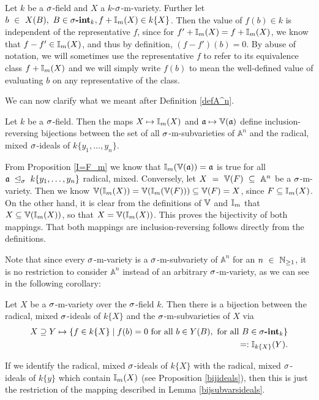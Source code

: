 \begin{rem}
Let $k$ be a $\sigma$-field and $X$ a $k$-$\sigma$-m-variety. Further let $b~\in~X(B), ~ B \in \sigma\text{{\normalfont\textbf{-int}}}_k, f + \mathbb{I}_m(X) \in k\{X\}$. Then the value of $f(b) \in k$ is independent of the representative $f$,
since for $f' + \mathbb{I}_m(X) = f + \mathbb{I}_m(X)$, we know that $f - f' \in \mathbb{I}_m(X)$, and thus by definition, $(f - f')(b) = 0$. By abuse of notation,
we will sometimes use the representative $f$ to refer to its equivalence class $f + \mathbb{I}_m(X)$ and we will simply write $f(b)$ to mean the well-defined value of evaluating $b$ on any representative of the class.
\end{rem}

We can now clarify what we meant after Definition \ref{defA^n}.

 \begin{lem}\label{bijsubvarsideals}
Let $k$ be a $\sigma$-field. Then the maps $X \mapsto \mathbb{I}_m(X)$ and $\mathfrak{a} \mapsto \mathbb{V}(\mathfrak{a})$ define inclusion-reversing bijections between the set of all $\sigma$-m-subvarieties of $\mathbb{A}^n$ and the radical, mixed $\sigma$-ideals of $k\{y_1,\ldots,y_n\}$.
\begin{bew}
From Proposition \ref{I=F_m} we know that $\mathbb{I}_m(\mathbb{V}(\mathfrak{a})) = \mathfrak{a}$ is true for all $\mathfrak{a}~\unlhd_{\sigma}~k\{y_1,\ldots,y_n\}$ radical, mixed. Conversely, let $X~=~\mathbb{V}(F)~\subseteq~\mathbb{A}^n$ be a $\sigma$-m-variety. Then we know  $\mathbb{V}(\mathbb{I}_m(X)) = \mathbb{V}(\mathbb{I}_m(\mathbb{V}(F))) \subseteq \mathbb{V}(F) = X$,
 since $F \subseteq \mathbb{I}_m(X)$. On the other hand, it is clear from the definitions of $\mathbb{V}$ and $ \mathbb{I}_m$ that $X \subseteq \mathbb{V}(\mathbb{I}_m(X))$, so that $X = \mathbb{V}(\mathbb{I}_m(X))$. This proves the bijectivity of both mappings. That both mappings are inclusion-reversing follows directly from the definitions.
\end{bew}
\end{lem}

Note that since every $\sigma$-m-variety is a $\sigma$-m-subvariety of $\mathbb{A}^n$ for an $n~\in~\mathbb{N}_{\geq1}$, it is no restriction to consider $\mathbb{A}^n$ instead of an arbitrary $\sigma$-m-variety, as we can see in the following corollary:
\begin{cor}
  Let $X$ be a $\sigma$-m-variety over the $\sigma$-field $k$. Then there is a bijection between the radical, mixed $\sigma$-ideals of $k\{X\}$ and the $\sigma$-m-subvarieties of $X$ via
 \begin{align*} X \supseteq Y \mapsto \{f \in k\{X\} \mid f(b) = 0 \text{ for all } b \in Y(B), \text{ for all } B \in \sigma\text{{\normalfont\textbf{-int}}}_k \} \\ =: \mathbb{I}_{k\{X\}}(Y). \end{align*}
\begin{bew}
If we identify the radical, mixed $\sigma$-ideals of $k\{X\}$ with the radical, mixed $\sigma$-ideals of $k\{y\}$ which contain $\mathbb{I}_m(X)$ (see Proposition \ref{bijideals}), then this is just the restriction of the mapping described in Lemma \ref{bijsubvarsideals}.
\end{bew}
\end{cor}

